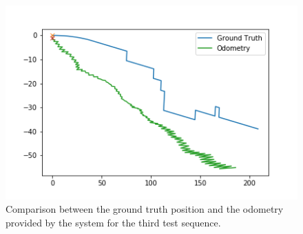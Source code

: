     \begin{figure}[h]
        \centering
        \includegraphics[width=0.65\columnwidth]{figuras/testeSeq5.png}
        \caption{Comparison between the ground truth position and the odometry provided by the system for the third test sequence.}
        \label{fig:seq5}
    \end{figure}